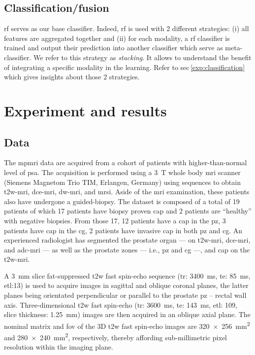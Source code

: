 \documentclass[a4paper,num-refs]{wiley-article}
\begin{document}
\subsection{Classification/fusion}

\ac{rf} serves as our base classifier. Indeed, \ac{rf} is used with 2 different
strategies: (i) all features are aggregated together and (ii) for each
modality, a \ac{rf} classifier is trained and output their prediction into
another classifier which serve as meta-classifier. We refer to this strategy as
\emph{stacking}. It allows to understand the benefit of integrating a specific
modality in the learning. Refer to \acs{sec}\,\ref{exp:classification} which
gives insights about those 2 strategies.

\section{Experiment and results}\label{sec:experiments}

\subsection{Data}\label{sec:data}

The \ac{mpmri} data are acquired from a cohort of patients with higher-than-normal level of \ac{psa}.
The acquisition is performed using a \SI{3}{\tesla} whole body \ac{mri} scanner (Siemens Magnetom Trio TIM, Erlangen, Germany) using sequences to obtain \ac{t2w}-\ac{mri}, \ac{dce}-\ac{mri}, \ac{dw}-\ac{mri}, and \ac{mrsi}.
Aside of the \ac{mri} examination, these patients also have undergone a guided-biopsy.
The dataset is composed of a total of 19 patients of which 17 patients have biopsy proven \ac{cap} and 2 patients are ``healthy'' with negative biopsies.
From those 17, 12 patients have a \ac{cap} in the \ac{pz}, 3 patients have \ac{cap} in the \ac{cg}, 2 patients have invasive \ac{cap} in both \ac{pz} and \ac{cg}.
An experienced radiologist has segmented the prostate organ --- on \ac{t2w}-\ac{mri}, \ac{dce}-\ac{mri}, and \ac{adc}-\ac{mri} --- as well as the prostate zones --- i.e., \ac{pz} and \ac{cg} ---, and \ac{cap} on the \ac{t2w}-\ac{mri}.

A \SI{3}{\mm} slice fat-suppressed \ac{t2w} fast spin-echo sequence (\ac{tr}: \SI{3400}{\ms}, \ac{te}: \SI{85}{\ms}, \ac{etl}:13) is used to acquire images in sagittal and oblique coronal planes, the latter planes being orientated perpendicular or parallel to the prostate \ac{pz} – rectal wall axis.
Three-dimensional \ac{t2w} fast spin-echo (\ac{tr}: \SI{3600}{\ms}, \ac{te}: \SI{143}{\ms}, \ac{etl}: 109, slice thickness: \SI{1.25}{\mm}) images are then acquired in an oblique axial plane.
The nominal matrix and \ac{fov} of the 3D \ac{t2w} fast spin-echo images are \SI[product-units=repeat]{320x256}{\milli\metre\squared} and \SI[product-units=repeat]{280x240}{\milli\metre\squared}, respectively, thereby affording sub-millimetric pixel resolution within the imaging plane.
\end{document}
